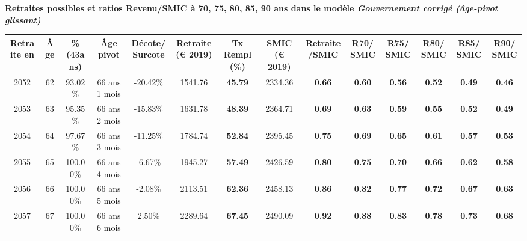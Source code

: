  \vspace{0.1cm} 
{\bf \noindent Retraites possibles et ratios Revenu/SMIC à 70, 75, 80, 85, 90 ans dans le modèle \emph{Gouvernement corrigé (âge-pivot glissant)}}  
 
\begin{adjustbox}{max width=\textwidth} 
\begin{tabular}[htb]{|c|c||c|c|c||c|c||c|c||c|c|c|c|c|} 
\hline 
 Retraite en &  Âge &  \%(43ans) &  Âge pivot &  Décote/Surcote &  Retraite (\euro{} 2019) &  Tx Rempl(\%) &  SMIC (\euro{} 2019) &  Retraite/SMIC &  R70/SMIC &  R75/SMIC &  R80/SMIC &  R85/SMIC &  R90/SMIC \\ 
\hline \hline 
 2052 &  62 &  93.02\% &  66 ans 1 mois &  -20.42\% &  1541.76 &  {\bf 45.79} &  2334.36 &  {\bf {\color{red} 0.66}} &  {\bf {\color{red} 0.60}} &  {\bf {\color{red} 0.56}} &  {\bf {\color{red} 0.52}} &  {\bf {\color{red} 0.49}} &  {\bf {\color{red} 0.46}} \\ 
\hline 
 2053 &  63 &  95.35\% &  66 ans 2 mois &  -15.83\% &  1631.78 &  {\bf 48.39} &  2364.71 &  {\bf {\color{red} 0.69}} &  {\bf {\color{red} 0.63}} &  {\bf {\color{red} 0.59}} &  {\bf {\color{red} 0.55}} &  {\bf {\color{red} 0.52}} &  {\bf {\color{red} 0.49}} \\ 
\hline 
 2054 &  64 &  97.67\% &  66 ans 3 mois &  -11.25\% &  1784.74 &  {\bf 52.84} &  2395.45 &  {\bf {\color{red} 0.75}} &  {\bf {\color{red} 0.69}} &  {\bf {\color{red} 0.65}} &  {\bf {\color{red} 0.61}} &  {\bf {\color{red} 0.57}} &  {\bf {\color{red} 0.53}} \\ 
\hline 
 2055 &  65 &  100.00\% &  66 ans 4 mois &  -6.67\% &  1945.27 &  {\bf 57.49} &  2426.59 &  {\bf {\color{red} 0.80}} &  {\bf {\color{red} 0.75}} &  {\bf {\color{red} 0.70}} &  {\bf {\color{red} 0.66}} &  {\bf {\color{red} 0.62}} &  {\bf {\color{red} 0.58}} \\ 
\hline 
 2056 &  66 &  100.00\% &  66 ans 5 mois &  -2.08\% &  2113.51 &  {\bf 62.36} &  2458.13 &  {\bf {\color{red} 0.86}} &  {\bf {\color{red} 0.82}} &  {\bf {\color{red} 0.77}} &  {\bf {\color{red} 0.72}} &  {\bf {\color{red} 0.67}} &  {\bf {\color{red} 0.63}} \\ 
\hline 
 2057 &  67 &  100.00\% &  66 ans 6 mois &  2.50\% &  2289.64 &  {\bf 67.45} &  2490.09 &  {\bf {\color{red} 0.92}} &  {\bf {\color{red} 0.88}} &  {\bf {\color{red} 0.83}} &  {\bf {\color{red} 0.78}} &  {\bf {\color{red} 0.73}} &  {\bf {\color{red} 0.68}} \\ 
\hline 
\hline 
\end{tabular} 
\end{adjustbox} 
 
